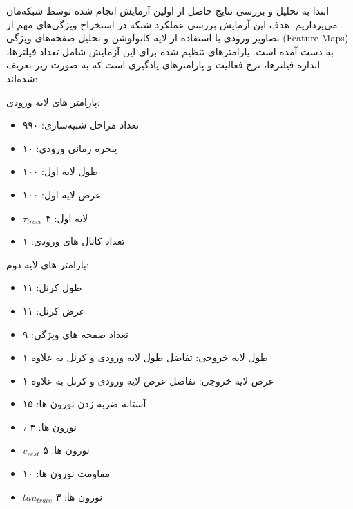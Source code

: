             ابتدا به تحلیل و بررسی نتایج حاصل از اولین آزمایش انجام شده توسط شبکه‌مان
            می‌پردازیم. هدف این آزمایش بررسی عملکرد شبکه در استخراج ویژگی‌های مهم از تصاویر ورودی با استفاده از لایه کانولوشن و تحلیل صفحه‌های ویژگی 
            (Feature Maps) 
            به دست آمده است. پارامترهای تنظیم شده برای این آزمایش شامل تعداد فیلترها، اندازه فیلترها، نرخ فعالیت و پارامترهای یادگیری است که به صورت زیر تعریف شده‌اند:
            \begin{multicols}{3}
                پارامتر های لایه ورودی:
                \begin{itemize}
                \item تعداد مراحل شبیه‌سازی: ۹۹۰
                \item پنجره زمانی ورودی: ۱۰
                \item طول لایه اول: ۱۰۰
                \item عرض لایه اول: ۱۰۰
                \item $\tau_{trace}$ لایه اول: ۴
                \item تعداد کانال های ورودی: ۱
                \end{itemize}
                
                \columnbreak
                
                پارامتر های لایه دوم:
                \begin{itemize}
                \item طول کرنل: ۱۱
                \item عرض کرنل: ۱۱
                \item تعداد صفحه های ویژگی: ۹
                \item طول لایه خروجی:  تفاضل طول لایه ورودی و کرنل به علاوه ۱
                \item عرض لایه خروجی:  تفاضل عرض لایه ورودی و کرنل به علاوه ۱
                \item آستانه ضربه زدن نورون ها: ۱۵
                \item $\tau$ نورون ها: ۳
                \item $v_{rest}$ نورون ها: ۵
                \item مقاومت نورون ها: ۱۰
                \item $tau_{trace}$ نورون ها: ۳
                \end{itemize}
                \columnbreak


\end{multicols}
